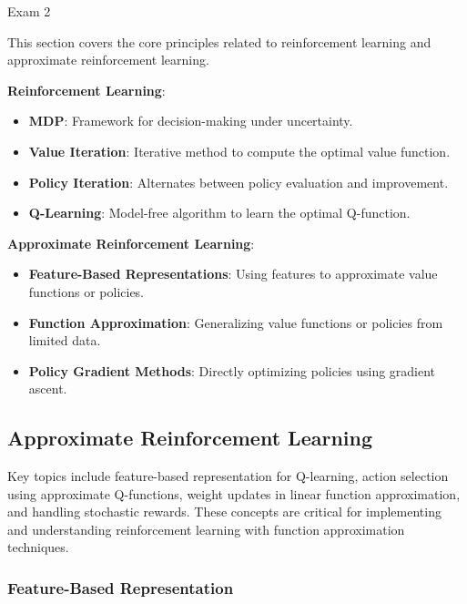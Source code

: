 \begin{examnotes}{Exam 2}
    \begin{highlight}
        This section covers the core principles related to reinforcement learning and approximate reinforcement learning.
    
        \textbf{Reinforcement Learning}:
        \begin{itemize}
            \item \textbf{MDP}: Framework for decision-making under uncertainty.
            \item \textbf{Value Iteration}: Iterative method to compute the optimal value function.
            \item \textbf{Policy Iteration}: Alternates between policy evaluation and improvement.
            \item \textbf{Q-Learning}: Model-free algorithm to learn the optimal Q-function.
        \end{itemize}
    
        \textbf{Approximate Reinforcement Learning}:
        \begin{itemize}
            \item \textbf{Feature-Based Representations}: Using features to approximate value functions or policies.
            \item \textbf{Function Approximation}: Generalizing value functions or policies from limited data.
            \item \textbf{Policy Gradient Methods}: Directly optimizing policies using gradient ascent.
        \end{itemize}
    \end{highlight}

    \subsection*{Approximate Reinforcement Learning}

    Key topics include feature-based representation for Q-learning, action selection using approximate Q-functions, weight updates in linear function approximation, and handling stochastic rewards. 
    These concepts are critical for implementing and understanding reinforcement learning with function approximation techniques.
    
    \subsubsection*{Feature-Based Representation}
    

\end{examnotes}
